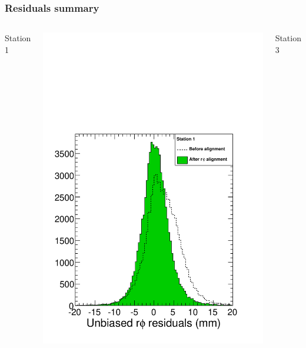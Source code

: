 \documentclass[compress]{beamer}
\begin{document}
\begin{frame}
\frametitle{Residuals summary}

\begin{columns}
Station 1

\includegraphics[width=\linewidth]{residuals_station1.pdf}

\vspace{0.5 cm}
Station 3


\end{columns}
\end{frame}
\end{document}
